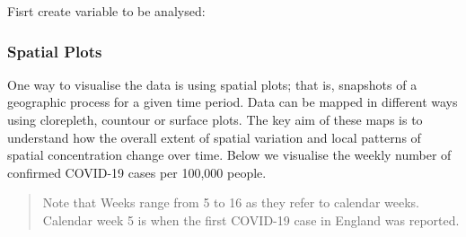 \documentclass[
]{book}
\newenvironment{Shaded}{\begin{snugshade}}{\end{snugshade}}
\newcommand{\CommentTok}[1]{\textcolor[rgb]{0.56,0.35,0.01}{\textit{#1}}}
\newcommand{\DecValTok}[1]{\textcolor[rgb]{0.00,0.00,0.81}{#1}}
\newcommand{\FunctionTok}[1]{\textcolor[rgb]{0.00,0.00,0.00}{#1}}
\newcommand{\NormalTok}[1]{#1}
\newcommand{\OtherTok}[1]{\textcolor[rgb]{0.56,0.35,0.01}{#1}}
\newcommand{\SpecialCharTok}[1]{\textcolor[rgb]{0.00,0.00,0.00}{#1}}
\begin{document}
Fisrt create variable to be analysed:

\begin{Shaded}
\end{Shaded}

\hypertarget{spatial-plots}{%
\subsubsection{Spatial Plots}\label{spatial-plots}}

One way to visualise the data is using spatial plots; that is, snapshots of a geographic process for a given time period. Data can be mapped in different ways using clorepleth, countour or surface plots. The key aim of these maps is to understand how the overall extent of spatial variation and local patterns of spatial concentration change over time. Below we visualise the weekly number of confirmed COVID-19 cases per 100,000 people.

\begin{quote}
Note that Weeks range from 5 to 16 as they refer to calendar weeks. Calendar week 5 is when the first COVID-19 case in England was reported.
\end{quote}
\end{document}
